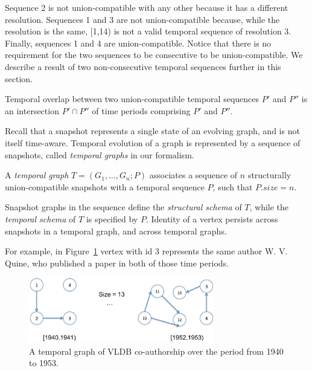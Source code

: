 Sequence 2 is not union-compatible with any other because it has a
different resolution.  Sequences 1 and 3 are not union-compatible
because, while the resolution is the same, [1,14) is not a valid
  temporal sequence of resolution 3.  Finally, sequences 1 and 4 are
  union-compatible.  Notice that there is no requirement for the two
  sequences to be consecutive to be union-compatible. We describe a
  result of two non-consecutive temporal sequences further in this
  section.

\begin{definition} 
\label{def:tseqoverlap}
Temporal overlap between two union-compatible temporal sequences $P'$
and $P''$ is an intersection $P' \cap P''$ of time periods comprising
$P'$ and $P''$.
\end{definition}

Recall that a snapshot represents a single state of an evolving graph,
and is not itself time-aware.  Temporal evolution of a graph is
represented by a sequence of snapshots, called {\em temporal graphs}
in our formalism. 

\begin{definition} 
\label{def:tgraph} 
A {\em temporal graph} $T = (G_1, \ldots, G_n; P)$ associates a
sequence of $n$ structurally union-compatible snapshots with a
temporal sequence $P$, such that $P.size = n$.
\end{definition}

Snapshot graphs in the sequence define the {\em structural schema} of
$T$, while the {\em temporal schema} of $T$ is specified by $P$.
Identity of a vertex persists across snapshots in a temporal graph,
and across temporal graphs.

For example, in Figure~\ref{fig:tgraph} vertex with id 3 represents
the same author W. V. Quine, who published a paper in both of those
time periods.

\begin{figure}
\label{fig:tgraph}
\includegraphics[width=3.2in]{figs/temporalgraph.pdf}
\caption{A temporal graph of VLDB co-authorship over the period from 1940 to 1953.}
\end{figure}

